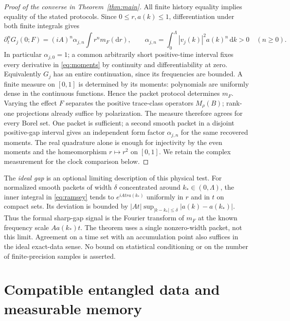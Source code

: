 \documentclass[11pt]{article}
\newcommand{\dd}{\mathrm d}
\begin{document}
\begin{proof}[Proof of the converse in Theorem~\ref{thm:main}]
All finite history equality implies equality of the stated protocols. Since \(0\leq r,a(k)\leq1\), differentiation under both finite integrals gives
\begin{equation}
 \partial_t^nG_j(0;F)
   =(iA)^n \alpha_{j,n}\int r^n m_F(\dd r),
 \qquad
 \alpha_{j,n}=\int_0^\Lambda |v_j(k)|^2a(k)^n\,\dd k>0
 \quad(n\geq0).
 \label{eq:moments}
\end{equation}
In particular \(\alpha_{j,0}=1\); a common arbitrarily short positive-time interval fixes every derivative in \eqref{eq:moments} by continuity and differentiability at zero. Equivalently \(G_j\) has an entire continuation, since its frequencies are bounded. A finite measure on \([0,1]\) is determined by its moments: polynomials are uniformly dense in the continuous functions. Hence the packet protocol determines \(m_F\). Varying the effect \(F\) separates the positive trace-class operators \(M_\rho(B)\); rank-one projections already suffice by polarization. The measure therefore agrees for every Borel set. One packet is sufficient; a second smooth packet in a disjoint positive-gap interval gives an independent form factor \(\alpha_{j,n}\) for the same recovered moments. The real quadrature alone is enough for injectivity by the even moments and the homeomorphism \(r\mapsto r^2\) on \([0,1]\). We retain the complex measurement for the clock comparison below.
\end{proof}

The \emph{ideal gap} is an optional limiting description of this physical test. For normalized smooth packets of width \(\delta\) concentrated around \(k_*\in(0,\Lambda)\), the inner integral in \eqref{eq:ramsey} tends to \(e^{iAt r a(k_*)}\) uniformly in \(r\) and in \(t\) on compact sets. Its deviation is bounded by \(|At|\sup_{|k-k_*|\leq\delta}|a(k)-a(k_*)|\). Thus the formal sharp-gap signal is the Fourier transform of \(m_F\) at the known frequency scale \(A a(k_*)t\). The theorem uses a single nonzero-width packet, not this limit. Agreement on a time set with an accumulation point also suffices in the ideal exact-data sense. No bound on statistical conditioning or on the number of finite-precision samples is asserted.

\section{Compatible entangled data and measurable memory}\label{sec:examples}
\end{document}
